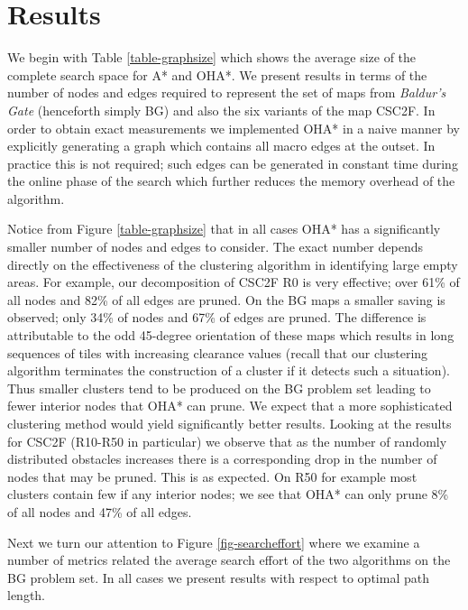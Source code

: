 \section{Results}
We begin with Table \ref{table-graphsize} which shows the average size of the complete search
space for A* and OHA*.
We present results in terms of the number of nodes and edges required to represent the set of 
maps from \emph{Baldur's Gate} (henceforth simply BG) and also the six variants of the map CSC2F.
In order to obtain exact measurements we implemented OHA* in a naive manner by explicitly 
generating a graph which contains all macro edges at the outset. 
In practice this is not required; such edges can be generated in constant time during the online
phase of the search which further reduces the memory overhead of the algorithm.

Notice from Figure \ref{table-graphsize} that in all cases OHA* has a significantly smaller number 
of nodes and edges to consider.
The exact number depends directly on the effectiveness of the clustering algorithm in identifying 
large empty areas.
For example, our decomposition of CSC2F R0 is very effective; over 61\% of all nodes and 82\% of all 
edges are pruned.
On the BG maps a smaller saving is observed; only 34\% of nodes and 67\% of edges are pruned.
The difference is attributable to the odd 45-degree orientation of these maps which results in 
long sequences of tiles with increasing clearance values 
(recall that our clustering algorithm terminates the construction of a cluster if it detects 
such a situation).
Thus smaller clusters tend to be produced on the BG problem set leading to fewer interior nodes that
OHA* can prune. 
We expect that a more sophisticated clustering method would yield significantly better results.
Looking at the results for CSC2F (R10-R50 in particular) we observe that as the number of 
randomly distributed obstacles increases there is a corresponding drop in the number of nodes that may be 
pruned.
This is as expected. 
On R50 for example most clusters contain few if any interior nodes; we see that OHA* can only prune 8\% of all nodes and 47\% of all edges.
\par
Next we turn our attention to Figure \ref{fig-searcheffort} where we examine a number of metrics
related the average search effort of the two algorithms on the BG problem set.
In all cases we present results with respect to optimal path length.
